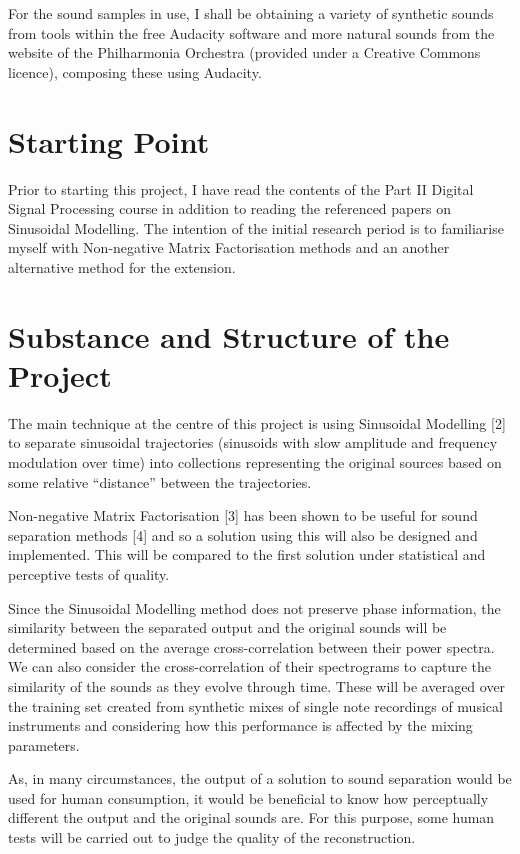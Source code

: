 \documentclass[12pt]{article}
\begin{document}
For the sound samples in use, I shall be obtaining a variety of synthetic sounds from tools within the free Audacity software and more natural sounds from the website of the Philharmonia Orchestra (provided under a Creative Commons licence), composing these using Audacity.

\section*{Starting Point}

Prior to starting this project, I have read the contents of the Part II Digital Signal Processing course in addition to reading the referenced papers on Sinusoidal Modelling. The intention of the initial research period is to familiarise myself with Non-negative Matrix Factorisation methods and an another alternative method for the extension.

\section*{Substance and Structure of the Project}

The main technique at the centre of this project is using Sinusoidal Modelling [2] to separate sinusoidal trajectories (sinusoids with slow amplitude and frequency modulation over time) into collections representing the original sources based on some relative ``distance'' between the trajectories.

Non-negative Matrix Factorisation [3] has been shown to be useful for sound separation methods [4] and so a solution using this will also be designed and implemented. This will be compared to the first solution under statistical and perceptive tests of quality.

Since the Sinusoidal Modelling method does not preserve phase information, the similarity between the separated output and the original sounds will be determined based on the average cross-correlation between their power spectra. We can also consider the cross-correlation of their spectrograms to capture the similarity of the sounds as they evolve through time. These will be averaged over the training set created from synthetic mixes of single note recordings of musical instruments and considering how this performance is affected by the mixing parameters.

As, in many circumstances, the output of a solution to sound separation would be used for human consumption, it would be beneficial to know how perceptually different the output and the original sounds are. For this purpose, some human tests will be carried out to judge the quality of the reconstruction.
\end{document}
